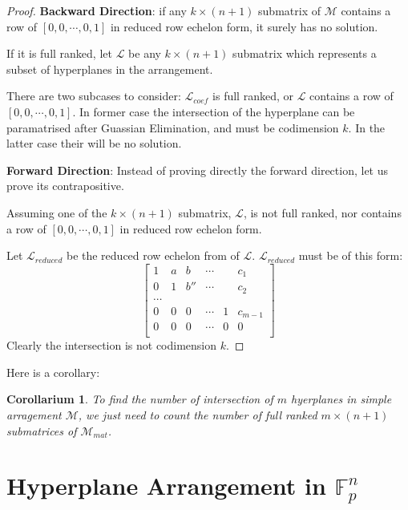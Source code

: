 \documentclass[12pt, a4paper]{article}
\newtheorem{corollary}[theorem]{Corollarium}
\theoremstyle{definition}
\theoremstyle{remark}
\begin{document}
\begin{proof}
	\textbf{Backward Direction}: if any $k\times (n+1)$ submatrix of $\mathcal{M}$ contains a row of $[0, 0, \cdots, 0, 1]$ in reduced row echelon form, it surely has no solution. 

	If it is full ranked, 
	let $\mathcal{L}$ be any $k \times (n+1)$ submatrix which represents a subset of hyperplanes in the arrangement.

	There are two subcases to consider: $\mathcal{L}_{coef}$  is full ranked, or $\mathcal{L}$ contains a row of $[0,0,\cdots , 0 ,1]$. 
	In former case the intersection of the hyperplane can be paramatrised after Guassian Elimination, and must be codimension $k$. In the latter case their will be no solution.

	\textbf{Forward Direction}: Instead of proving directly the forward direction, let us prove its contrapositive. 

	Assuming one of the $k \times (n+1)$ submatrix, $\mathcal{L}$, is not full ranked, nor contains a row of $[0, 0, \cdots, 0, 1]$ in reduced row echelon form.

	Let $\mathcal{L}_{reduced}$ be the reduced row echelon from of $\mathcal{L}$.
		 $\mathcal{L}_{reduced}$ must be of this form:
			$$
			\begin{bmatrix}
				1 & a & b & \cdots &  &  c_1\\
				0 & 1 & b'' & \cdots &  &  c_2\\
				\cdots \\
				0 & 0 & 0 & \cdots & 1 &  c_{m-1}\\
				0 & 0 & 0 & \cdots & 0 & 0 \\
			\end{bmatrix}
			$$
	Clearly the intersection is not codimension $k$.
\end{proof}

Here is a corollary:

\begin{corollary}
	\label{cor:intersection of m hyperplanes}
	To find the number of intersection of $m$ hyerplanes in simple arragement $\mathcal{M}$, we just need to count the number of full ranked $m \times (n+1)$ submatrices of $\mathcal{M}_{mat}$. 
\end{corollary}

\section{Hyperplane Arrangement in $\mathbb{F}_p^n$}
\end{document}
